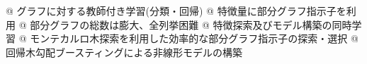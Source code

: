 \begin{tcolorbox}[title={\large 概要}]
	\begin{easylist}[itemize]
			@ グラフに対する教師付き学習(分類・回帰)
			\vspace{10pt}
			@ 特徴量に部分グラフ指示子を利用
			\vspace{10pt}
			@ 部分グラフの総数は膨大、全列挙困難
			\vspace{10pt}
			@ 特徴探索及びモデル構築の同時学習
			\vspace{10pt}
			@ モンテカルロ木探索を利用した効率的な部分グラフ指示子の探索・選択
			\vspace{10pt}
			@ 回帰木勾配ブースティングによる非線形モデルの構築
		\end{easylist}
	\end{tcolorbox}
